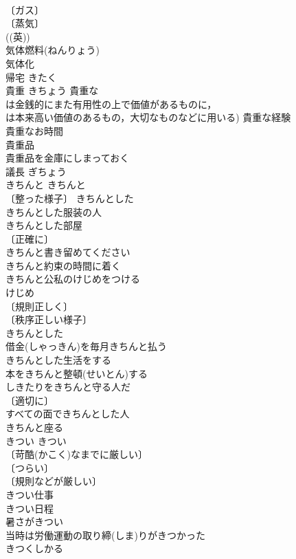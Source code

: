 \documentclass[8pt]{extreport}
\begin{document}
\begin{CJK}{UTF8}{min}
\\	〔ガス〕
\\	〔蒸気〕
\\	((英)) 
\\	気体燃料(ねんりょう) 
\\	気体化 
\\	帰宅	きたく	
\\	貴重	きちょう	貴重な 
\\	は金銭的にまた有用性の上で価値があるものに，
\\	は本来高い価値のあるもの，大切なものなどに用いる) 貴重な経験 
\\	貴重なお時間 
\\	貴重品 
\\	貴重品を金庫にしまっておく 
\\	議長	ぎちょう	
\\	きちんと	きちんと	
\\	〔整った様子〕 きちんとした 
\\	きちんとした服装の人 
\\	きちんとした部屋 
\\	〔正確に〕
\\	きちんと書き留めてください 
\\	きちんと約束の時間に着く 
\\	きちんと公私のけじめをつける 
\\	けじめ 
\\	〔規則正しく〕
\\	〔秩序正しい様子〕
\\	きちんとした 
\\	借金(しゃっきん)を毎月きちんと払う 
\\	きちんとした生活をする 
\\	本をきちんと整頓(せいとん)する 
\\	しきたりをきちんと守る人だ 
\\	〔適切に〕
\\	すべての面できちんとした人 
\\	きちんと座る 
\\	きつい	きつい	
\\	〔苛酷(かこく)なまでに厳しい〕
\\	〔つらい〕
\\	〔規則などが厳しい〕
\\	きつい仕事 
\\	きつい日程 
\\	暑さがきつい 
\\	当時は労働運動の取り締(しま)りがきつかった 
\\	きつくしかる 

\end{CJK}
\end{document}
